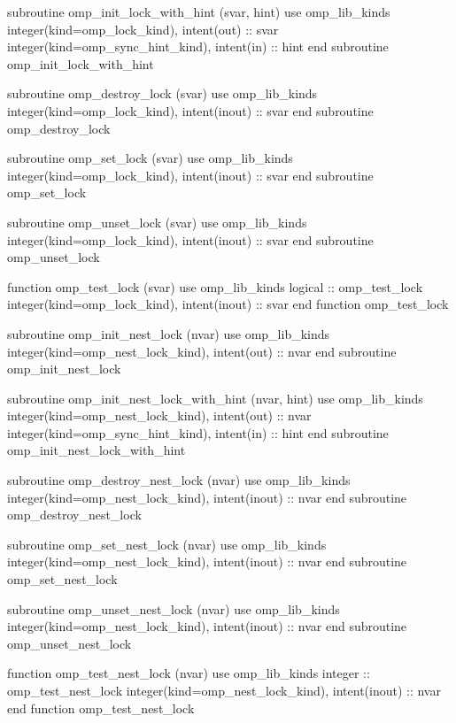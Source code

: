 {\begin{ompfFunction}
          subroutine omp_init_lock_with_hint (svar, hint)
           use omp_lib_kinds
           integer(kind=omp_lock_kind), intent(out) :: svar
           integer(kind=omp\_sync\_hint\_kind), intent(in) :: hint
          end subroutine omp_init_lock_with_hint

          subroutine omp_destroy_lock (svar)
           use omp_lib_kinds
           integer(kind=omp_lock_kind), intent(inout) :: svar
          end subroutine omp_destroy_lock

          subroutine omp_set_lock (svar)
           use omp_lib_kinds
           integer(kind=omp_lock_kind), intent(inout) :: svar
          end subroutine omp_set_lock

          subroutine omp_unset_lock (svar)
           use omp_lib_kinds
           integer(kind=omp_lock_kind), intent(inout) :: svar
          end subroutine omp_unset_lock

          function omp_test_lock (svar)
           use omp_lib_kinds
           logical :: omp_test_lock
           integer(kind=omp_lock_kind), intent(inout) :: svar
          end function omp_test_lock

          subroutine omp_init_nest_lock (nvar)
           use omp_lib_kinds
           integer(kind=omp_nest_lock_kind), intent(out) :: nvar
          end subroutine omp_init_nest_lock

          subroutine omp_init_nest_lock_with_hint (nvar, hint)
           use omp_lib_kinds
           integer(kind=omp_nest_lock_kind), intent(out) :: nvar
           integer(kind=omp\_sync\_hint\_kind), intent(in) :: hint
          end subroutine omp_init_nest_lock_with_hint

          subroutine omp_destroy_nest_lock (nvar)
           use omp_lib_kinds
           integer(kind=omp_nest_lock_kind), intent(inout) :: nvar
          end subroutine omp_destroy_nest_lock

          subroutine omp_set_nest_lock (nvar)
           use omp_lib_kinds
           integer(kind=omp_nest_lock_kind), intent(inout) :: nvar
          end subroutine omp_set_nest_lock

          subroutine omp_unset_nest_lock (nvar)
           use omp_lib_kinds
           integer(kind=omp_nest_lock_kind), intent(inout) :: nvar
          end subroutine omp_unset_nest_lock

          function omp_test_nest_lock (nvar)
           use omp_lib_kinds
           integer :: omp_test_nest_lock
           integer(kind=omp_nest_lock_kind), intent(inout) :: nvar
          end function omp_test_nest_lock


\end{ompfFunction}}
